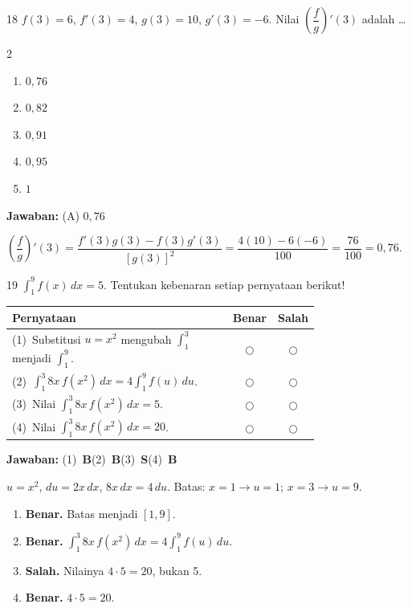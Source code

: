 \documentclass[11pt]{article}
\newcommand{\jawaban}[1]{%
  \noindent\colorbox{gold!30}{\parbox{\dimexpr\linewidth-2\fboxsep\relax}{%
    \textbf{Jawaban:} #1}}\par\smallskip}
\newenvironment{pilB}{%
  \par\smallskip\begin{multicols}{2}
  \begin{enumerate}[label=(\Alph*),leftmargin=*,itemsep=1pt,topsep=3pt]}%
  {\end{enumerate}\end{multicols}}
\begin{document}
\begin{soal}{18}
$f(3)=6$, $f'(3)=4$, $g(3)=10$, $g'(3)=-6$. Nilai $\left(\dfrac{f}{g}\right)'(3)$ adalah \ldots
\begin{pilB}\item $0{,}76$\item $0{,}82$\item $0{,}91$\item $0{,}95$\item $1$\end{pilB}
\end{soal}
\begin{pembox}
\jawaban{(A) $0{,}76$}
$\left(\dfrac{f}{g}\right)'(3)=\dfrac{f'(3)g(3)-f(3)g'(3)}{[g(3)]^2}=\dfrac{4(10)-6(-6)}{100}=\dfrac{76}{100}=0{,}76$.
\end{pembox}

\begin{soal}{19}
$\displaystyle\int_1^9 f(x)\,dx=5$.
Tentukan kebenaran setiap pernyataan berikut!

\par\smallskip
{\renewcommand{\arraystretch}{1.4}%
\begin{tabular}{@{}p{0.76\linewidth}cc@{}}
\hline\textbf{Pernyataan}&\textbf{Benar}&\textbf{Salah}\\\hline
(1)~Substitusi $u=x^2$ mengubah $\int_1^3$ menjadi $\int_1^9$.&$\bigcirc$&$\bigcirc$\\
(2)~$\displaystyle\int_1^3 8x\,f(x^2)\,dx=4\int_1^9 f(u)\,du$.&$\bigcirc$&$\bigcirc$\\
(3)~Nilai $\displaystyle\int_1^3 8x\,f(x^2)\,dx=5$.&$\bigcirc$&$\bigcirc$\\
(4)~Nilai $\displaystyle\int_1^3 8x\,f(x^2)\,dx=20$.&$\bigcirc$&$\bigcirc$\\\hline
\end{tabular}}
\end{soal}
\begin{pembox}
\jawaban{(1)~\textbf{B}\quad(2)~\textbf{B}\quad(3)~\textbf{S}\quad(4)~\textbf{B}}
$u=x^2$, $du=2x\,dx$, $8x\,dx=4\,du$. Batas: $x{=}1\to u{=}1$; $x{=}3\to u{=}9$.
\begin{enumerate}[leftmargin=*,topsep=2pt,itemsep=2pt]
\item \textbf{Benar.} Batas menjadi $[1,9]$.
\item \textbf{Benar.} $\displaystyle\int_1^3 8x\,f(x^2)\,dx=4\int_1^9 f(u)\,du$.
\item \textbf{Salah.} Nilainya $4\cdot5=20$, bukan 5.
\item \textbf{Benar.} $4\cdot5=20$.
\end{enumerate}
\end{pembox}
\end{document}
